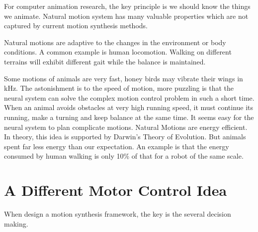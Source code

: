 For computer animation research, the key principle is we should know the things we animate.
Natural motion system has many valuable properties which are not captured by current motion synthesis methods.
\begin{itemize} 
Natural motions are adaptive to the changes in the environment or body conditions. 
A common example is human locomotion. 
Walking on different terrains will exhibit different gait while the balance is maintained. 

Some motions of animals are very fast, honey birds may vibrate their wings in kHz.
The astonishment is to the speed of motion, more puzzling is that the neural system can solve the complex motion control problem in such a short time. 
When an animal avoids obstacles at very high running speed, 
it must continue its running, make a turning and keep balance at the same time. 
It seems easy for the neural system to plan complicate motions.
Natural Motions are energy efficient.
In theory, this idea is supported by Darwin's Theory of Evolution.
But animals spent far less energy than our expectation.
An example is that the energy consumed by human walking is only 10\% of that for a robot of the same scale.
\end{itemize}


\section{A Different Motor Control Idea}


When design a motion synthesis framework, the key is the several decision making.


